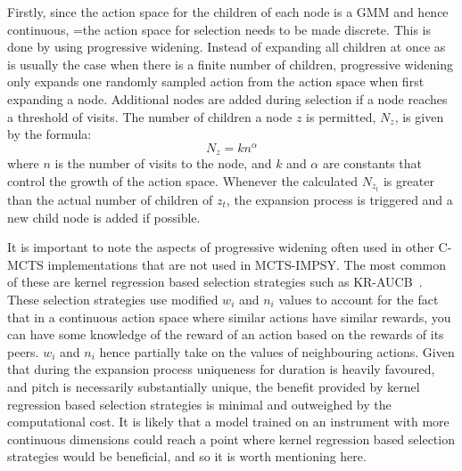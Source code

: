 Firstly, since the action space for the children of each node is a GMM and hence continuous, =the action space for selection needs to be made discrete. This is done by using progressive widening. Instead of expanding all children at once as is usually the case when there is a finite number of children, progressive widening only expands one randomly sampled action from the action space when first expanding a node. Additional nodes are added during selection if a node reaches a threshold of visits. The number of children a node $z$ is permitted, $N_{z}$, is given by the formula:
\begin{equation}
    N_{z} = kn^{\alpha}
\end{equation}
where $n$ is the number of visits to the node, and $k$ and $\alpha$ are constants that control the growth of the action space. Whenever the calculated $N_{z_t}$ is greater than the actual number of children of $z_t$, the expansion process is triggered and a new child node is added if possible.

It is important to note the aspects of progressive widening often used in other C-MCTS implementations that are not used in MCTS-IMPSY. The most common of these are kernel regression based selection strategies such as KR-AUCB~\citep{Lei2021KBTree}. These selection strategies use modified $w_i$ and $n_i$ values to account for the fact that in a continuous action space where similar actions have similar rewards, you can have some knowledge of the reward of an action based on the rewards of its peers. $w_i$ and $n_i$ hence partially take on the values of neighbouring actions. Given that during the expansion process uniqueness for duration is heavily favoured, and pitch is necessarily substantially unique, the benefit provided by kernel regression based selection strategies is minimal and outweighed by the computational cost. It is likely that a model trained on an instrument with more continuous dimensions could reach a point where kernel regression based selection strategies would be beneficial, and so it is worth mentioning here.

